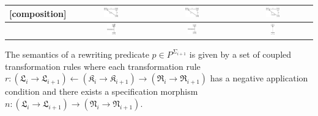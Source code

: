 \documentclass{eceasst}
\begin{document}
\begin{table}[h]
\begin{center}
\begin{tabular}{| l | c | c | c | }
    [composition] 	& \includegraphics[width=0.19\textwidth]{comp-L.pdf} & \includegraphics[width=0.19\textwidth]{comp-R.pdf} & \includegraphics[width=0.19\textwidth]{comp-vis.pdf}  \\ \hline 			
    [inheritance] 	& \includegraphics[width=0.12\textwidth]{inheritance-L.pdf} & \includegraphics[width=0.12\textwidth]{inheritance-R.pdf} & \includegraphics[width=0.05\textwidth]{inheritance-vis.pdf}  \\ 
    \hline    
    \end{tabular}
    \end{center}
\end{table}
\normalsize

\begin{definition}
 The semantics of a rewriting predicate $p \in P^{\Sigma_{i+1}}$ is given by a set of coupled transformation rules where each transformation 
 rule $r: (\mathfrak{L}_i \rightarrow \mathfrak{L}_{i+1})   \leftarrow (\mathfrak{K}_i \rightarrow \mathfrak{K}_{i+1})  \rightarrow 
 (\mathfrak{R}_i \rightarrow \mathfrak{R}_{i+1}) $ has a negative application condition and there exists a specification morphism 
 $n: (\mathfrak{L}_i \rightarrow \mathfrak{L}_{i+1}) \rightarrow (\mathfrak{N}_i \rightarrow \mathfrak{N}_{i+1}) $. 
\end{definition}
\end{document}
